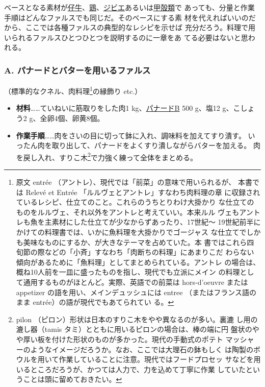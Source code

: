 ベースとなる素材が\ul{仔牛}、\ul{鶏}、\ul{ジビエ}あるいは\ul{甲殻類}で
あっても、分量と作業手順はどんなファルスでも同じだ。そのベースにする素
材を代えればいいのだから、ここでは各種ファルスの典型的なレシピを示せば
充分だろう。料理で用いられるファルスひとつひとつを説明するのに一章をあ
てる必要はないと思われる。
\begin{recette}
\hypertarget{farce-a}{%
\subsubsection{A. パナードとバターを用いるファルス}\label{farce-a}}



（標準的なクネル、肉料理\footnote{原文 entrée
  （アントレ）、現代では「前菜」の意味で用いられるが、 本書では Relevé
  et Entrée 「ルルヴェとアントレ」すなわち肉料理の章
  に収録されているレシピ、仕立てのこと。これらのうちとりわけ大掛かり
  な仕立てのものをルルヴェ、それ以外をアントレと考えていい。本来ルル
  ヴェもアントレも魚を主素材にした仕立てが少なからずあったり、17世紀〜
  19世紀前半にかけての料理書では、いかに魚料理を大掛かりでゴージャス
  な仕立てでしかも美味なものにするか、が大きなテーマを占めていた。本
  書ではこれら四旬節の際などの「小斉」すなわち「肉断ちの料理」にあまりこだ
  わらない傾向があるために「魚料理」としてまとめられている。アントレ
  の場合は、概ね10人前を一皿に盛ったものを指し、現代でも立派にメイン
  の料理として通用するものがほとんど。実際、英語での前菜は hors-d'oeuvre
  または appetizer の語を用い、メインデュッシュには entree
  （またはフランス語のまま entrée）の語が現代でもあてられてい る。}の縁飾り
etc.）

\begin{itemize}
\item
  \textbf{材料}\ldots{}\ldots{}ていねいに筋取りをした肉1
  kg、\protect\hyperlink{panade-b}{パナードB} 500 g、塩12 g、こしょう2
  g、全卵4個、卵黄8個。
\item
  \textbf{作業手順}\ldots{}\ldots{}肉をさいの目に切って鉢に入れ、調味料を加えてすり潰す。
  いったん肉を取り出して、パナードをよくすり潰しながらバターを加える。
  肉を戻し入れ、すりこ木\footnote{pilon
    （ピロン）形状は日本のすりこ木をやや異なるのが多い。裏漉
    し用の漉し器（tamis タミ）とともに用いるピロンの場合は、棒の端に円
    盤状のやや厚い板を付けた形状のものが多かった。現代の手動式のポテト
    マッシャーのようなイメージだろうか。なお、ここでは大理石の鉢もしく
    は陶製のボウルを用いて作業していることに注意。現代ではフードプロセッ
    サなどを用いるところだろうが、かつては人力で、力を込めて丁寧に作業
    していたということは頭に留めておきたい。}で力強く練って全体をまとめる。
\end{itemize}


\end{recette}
